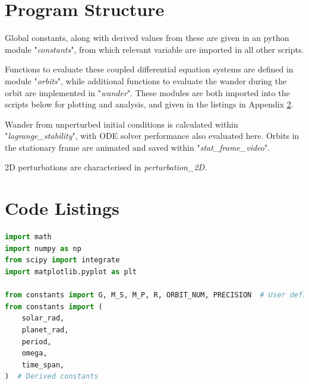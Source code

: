 \documentclass[11pt, a4paper,twocolumn]{article} %
\begin{document}
\onecolumn
\begin{appendices}
\section{Program Structure} \label{structure}
Global constants, along with derived values from these are given in an python module "\textit{constants}", from which relevant variable are imported in all other scripts.

Functions to evaluate these coupled differential equation systems are defined in module "\textit{orbits}", while additional functions to evaluate the wander during the orbit are implemented in "\textit{wander}". These modules are both imported into the scripts below for plotting and analysis, and given in the listings in Appendix \ref{Code}.

Wander from unperturbed initial conditions is calculated within "\textit{lagrange\_stability}", with ODE solver performance also evaluated here.
Orbits in the stationary frame are animated and saved within "\textit{stat\_frame\_video}".

2D perturbations are characterised in \textit{perturbation\_2D}.


\section{Code Listings} \label{Code}
\begin{lstlisting}[language=Python]
import math
import numpy as np
from scipy import integrate
import matplotlib.pyplot as plt

from constants import G, M_S, M_P, R, ORBIT_NUM, PRECISION  # User defined constants
from constants import (
	solar_rad,
	planet_rad,
	period,
	omega,
	time_span,
)  # Derived constants


\end{lstlisting}

\end{appendices}
\end{document}
